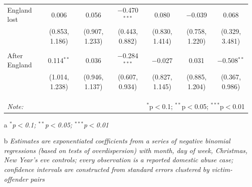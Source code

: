 \documentclass[12pt, a4paper]{article}
\begin{document}
\begin{table}
{\begin{threeparttable}
\begin{tabular}{@{\extracolsep{5pt}}lcccccc}
 England lost & 0.006 & 0.056 & $-$0.470$^{***}$ & 0.080 & $-$0.039 & 0.068 \\ 
  & (0.853, 1.186) & (0.907, 1.233) & (0.443, 0.882) & (0.830, 1.414) & (0.758, 1.220) & (0.329, 3.481) \\ 
  & & & & & & \\ 
 After England & 0.114$^{**}$ & 0.036 & $-$0.284$^{***}$ & $-$0.027 & 0.031 & $-$0.508$^{**}$ \\ 
  & (1.014, 1.238) & (0.946, 1.137) & (0.607, 0.934) & (0.827, 1.145) & (0.885, 1.204) & (0.367, 0.986) \\ 
  & & & & & & \\ 
\hline \\[-1.8ex] 
\hline 
\hline \\[-1.8ex] 
\textit{Note:}  & \multicolumn{6}{r}{$^{*}$p$<$0.1; $^{**}$p$<$0.05; $^{***}$p$<$0.01} \\ 
\end{tabular} 
\begin{tablenotes}
      \item[a] \textit{$^{*}$p$<$0.1; $^{**}$p$<$0.05; $^{***}$p$<$0.01}
      \item[b] \textit{Estimates are exponentiated coefficients from a series of negative binomial regressions (based on tests of overdispersion) with month, day of week, Christmas, New Year's eve controls; every observation is a reported domestic abuse case; confidence intervals are constructed from standard errors clustered by victim-offender pairs}
    \end{tablenotes}
\end{threeparttable}   }
\end{table}
\end{document}
